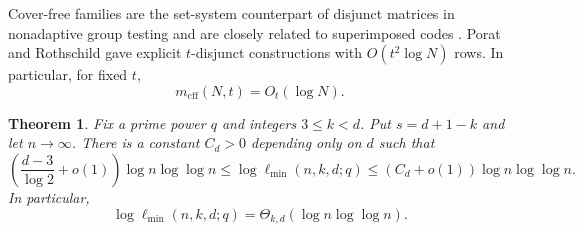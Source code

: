 \documentclass[11pt,onecolumn]{IEEEtran}
\newtheorem{theorem}{Theorem}
\newcommand{\mcff}{m_{\mathrm{cff}}}
\newcommand{\ellmin}{\ell_{\min}}
\begin{document}
Cover-free families are the set-system counterpart of disjunct
matrices in nonadaptive group testing and are closely related to
superimposed codes \cite{KautzSingleton1964}.
Porat and Rothschild \cite{PoratRothschild2011} gave explicit
$t$-disjunct constructions with $O(t^2\log N)$ rows.  In
particular, for fixed $t$,
\begin{equation}
\mcff(N,t)=O_t(\log N).
\label{eq:CFF-fixed-t}
\end{equation}

\begin{theorem}
\label{thm:fixed-kd-asymptotic}
Fix a prime power $q$ and integers $3\le k<d$.  Put
$s=d+1-k$ and let $n\to\infty$.
There is a constant $C_d>0$ depending only on $d$ such that
\begin{equation}
\left(\frac{d-3}{\log2}+o(1)\right)\log n\log\log n
\le\log\ellmin(n,k,d;q)\le(C_d+o(1))\log n\log\log n.
\label{eq:fixed-kd-two-sided}
\end{equation}
In particular,
\[
\log\ellmin(n,k,d;q)
=\Theta_{k,d}(\log n\log\log n).
\]
\end{theorem}
\end{document}

